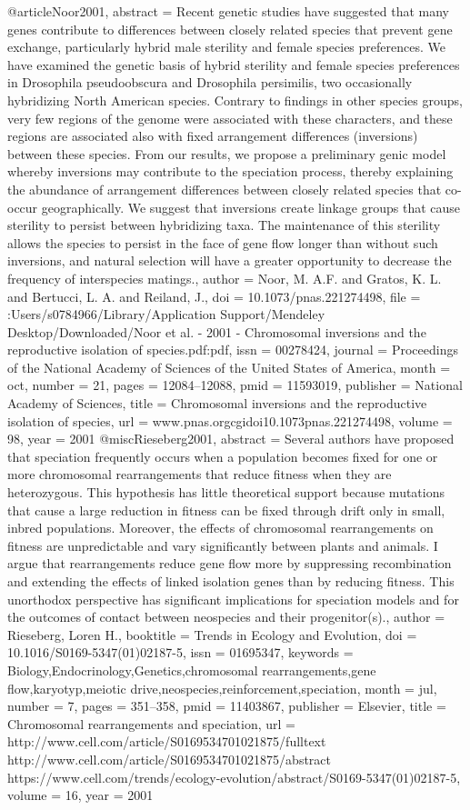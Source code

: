 @article{Noor2001,
abstract = {Recent genetic studies have suggested that many genes contribute to differences between closely related species that prevent gene exchange, particularly hybrid male sterility and female species preferences. We have examined the genetic basis of hybrid sterility and female species preferences in Drosophila pseudoobscura and Drosophila persimilis, two occasionally hybridizing North American species. Contrary to findings in other species groups, very few regions of the genome were associated with these characters, and these regions are associated also with fixed arrangement differences (inversions) between these species. From our results, we propose a preliminary genic model whereby inversions may contribute to the speciation process, thereby explaining the abundance of arrangement differences between closely related species that co-occur geographically. We suggest that inversions create linkage groups that cause sterility to persist between hybridizing taxa. The maintenance of this sterility allows the species to persist in the face of gene flow longer than without such inversions, and natural selection will have a greater opportunity to decrease the frequency of interspecies matings.},
author = {Noor, M. A.F. and Gratos, K. L. and Bertucci, L. A. and Reiland, J.},
doi = {10.1073/pnas.221274498},
file = {:Users/s0784966/Library/Application Support/Mendeley Desktop/Downloaded/Noor et al. - 2001 - Chromosomal inversions and the reproductive isolation of species.pdf:pdf},
issn = {00278424},
journal = {Proceedings of the National Academy of Sciences of the United States of America},
month = {oct},
number = {21},
pages = {12084--12088},
pmid = {11593019},
publisher = {National Academy of Sciences},
title = {{Chromosomal inversions and the reproductive isolation of species}},
url = {www.pnas.orgcgidoi10.1073pnas.221274498},
volume = {98},
year = {2001}
}
@misc{Rieseberg2001,
abstract = {Several authors have proposed that speciation frequently occurs when a population becomes fixed for one or more chromosomal rearrangements that reduce fitness when they are heterozygous. This hypothesis has little theoretical support because mutations that cause a large reduction in fitness can be fixed through drift only in small, inbred populations. Moreover, the effects of chromosomal rearrangements on fitness are unpredictable and vary significantly between plants and animals. I argue that rearrangements reduce gene flow more by suppressing recombination and extending the effects of linked isolation genes than by reducing fitness. This unorthodox perspective has significant implications for speciation models and for the outcomes of contact between neospecies and their progenitor(s).},
author = {Rieseberg, Loren H.},
booktitle = {Trends in Ecology and Evolution},
doi = {10.1016/S0169-5347(01)02187-5},
issn = {01695347},
keywords = {Biology,Endocrinology,Genetics,chromosomal rearrangements,gene flow,karyotyp,meiotic drive,neospecies,reinforcement,speciation},
month = {jul},
number = {7},
pages = {351--358},
pmid = {11403867},
publisher = {Elsevier},
title = {{Chromosomal rearrangements and speciation}},
url = {http://www.cell.com/article/S0169534701021875/fulltext http://www.cell.com/article/S0169534701021875/abstract https://www.cell.com/trends/ecology-evolution/abstract/S0169-5347(01)02187-5},
volume = {16},
year = {2001}
}
